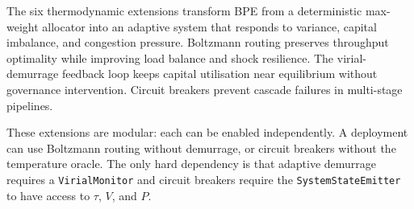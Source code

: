 \documentclass[11pt]{article}
\theoremstyle{definition}
\theoremstyle{remark}
\begin{document}
The six thermodynamic extensions transform BPE from a deterministic
max-weight allocator into an adaptive system that responds to
variance, capital imbalance, and congestion pressure. Boltzmann
routing preserves throughput optimality while improving load balance
and shock resilience. The virial-demurrage feedback loop keeps
capital utilisation near equilibrium without governance intervention.
Circuit breakers prevent cascade failures in multi-stage pipelines.

These extensions are modular: each can be enabled independently. A
deployment can use Boltzmann routing without demurrage, or circuit
breakers without the temperature oracle. The only hard dependency is
that adaptive demurrage requires a \texttt{VirialMonitor} and
circuit breakers require the \texttt{SystemStateEmitter} to have
access to $\tau$, $V$, and $P$.



\end{document}
